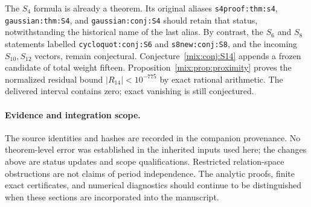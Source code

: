 The $S_4$ formula is already a theorem. Its original aliases
\texttt{s4proof:thm:s4}, \texttt{gaussian:thm:S4}, and
\texttt{gaussian:conj:S4} should retain that status, notwithstanding the
historical name of the last alias. By contrast, the $S_6$ and $S_8$
statements labelled \texttt{cycloquot:conj:S6} and
\texttt{s8new:conj:S8}, and the incoming $S_{10},S_{12}$ vectors,
remain conjectural. Conjecture~\ref{mix:conj:S14} appends a frozen
candidate of total weight fifteen. Proposition~\ref{mix:prop:proximity}
proves the normalized residual bound $|R_{14}|<10^{-775}$ by exact
rational arithmetic. The delivered interval contains zero; exact
vanishing is still conjectured.

\paragraph{Evidence and integration scope.}
The source identities and hashes are recorded in the companion
provenance. No theorem-level error was established in the inherited
inputs used here; the changes above are status updates and scope
qualifications. Restricted relation-space obstructions are not claims
of period independence. The analytic proofs, finite exact certificates,
and numerical diagnostics should continue to be distinguished when
these sections are incorporated into the manuscript.

